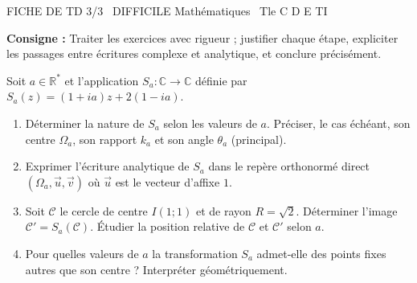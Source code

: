 \documentclass[11pt]{article}
\begin{document}
\begin{tcolorbox}[enhanced,colback=popink,colframe=popink,arc=10pt,boxrule=0pt,left=12pt,right=12pt,top=9pt,bottom=9pt]
{\color{white}\popxbold\small FICHE DE TD 3/3 \textbullet\ DIFFICILE \hfill Mathématiques \textbullet\ Tle C D E TI\par}
\end{tcolorbox}
\vspace{4pt}
\noindent\textbf{Consigne :} Traiter les exercices avec rigueur ; justifier chaque étape, expliciter les passages entre écritures complexe et analytique, et conclure précisément.

\begin{exercice}
Soit $a \in \mathbb{R}^*$ et l'application $S_a : \mathbb{C} \to \mathbb{C}$ définie par $S_a(z) = (1+ia)z + 2(1-ia)$.
\begin{enumerate}
    \item Déterminer la nature de $S_a$ selon les valeurs de $a$. Préciser, le cas échéant, son centre $\Omega_a$, son rapport $k_a$ et son angle $\theta_a$ (principal).
    \item Exprimer l'écriture analytique de $S_a$ dans le repère orthonormé direct $(\Omega_a, \vec{u}, \vec{v})$ où $\vec{u}$ est le vecteur d'affixe $1$.
    \item Soit $\mathcal{C}$ le cercle de centre $I(1;1)$ et de rayon $R=\sqrt{2}$. Déterminer l'image $\mathcal{C}' = S_a(\mathcal{C})$. Étudier la position relative de $\mathcal{C}$ et $\mathcal{C}'$ selon $a$.
    \item Pour quelles valeurs de $a$ la transformation $S_a$ admet-elle des points fixes autres que son centre ? Interpréter géométriquement.
\end{enumerate}
\end{exercice}
\end{document}
